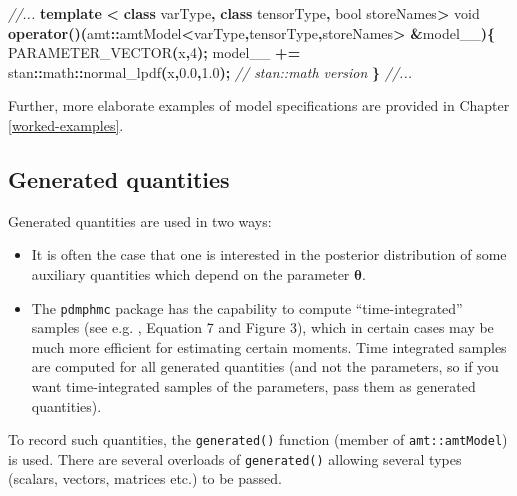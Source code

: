 \documentclass[
]{book}
\newenvironment{Shaded}{\begin{snugshade}}{\end{snugshade}}
\newcommand{\CommentTok}[1]{\textcolor[rgb]{0.56,0.35,0.01}{\textit{#1}}}
\newcommand{\DataTypeTok}[1]{\textcolor[rgb]{0.13,0.29,0.53}{#1}}
\newcommand{\DecValTok}[1]{\textcolor[rgb]{0.00,0.00,0.81}{#1}}
\newcommand{\FloatTok}[1]{\textcolor[rgb]{0.00,0.00,0.81}{#1}}
\newcommand{\KeywordTok}[1]{\textcolor[rgb]{0.13,0.29,0.53}{\textbf{#1}}}
\newcommand{\NormalTok}[1]{#1}
\newcommand{\OperatorTok}[1]{\textcolor[rgb]{0.81,0.36,0.00}{\textbf{#1}}}
\begin{document}
\begin{Shaded}
\begin{Highlighting}[]
\CommentTok{//...}
  \KeywordTok{template} \OperatorTok{\textless{}} \KeywordTok{class}\NormalTok{ varType}\OperatorTok{,} \KeywordTok{class}\NormalTok{ tensorType}\OperatorTok{,} \DataTypeTok{bool}\NormalTok{ storeNames}\OperatorTok{\textgreater{}}
  \DataTypeTok{void} \KeywordTok{operator}\OperatorTok{()(}\NormalTok{amt}\OperatorTok{::}\NormalTok{amtModel}\OperatorTok{\textless{}}\NormalTok{varType}\OperatorTok{,}\NormalTok{tensorType}\OperatorTok{,}\NormalTok{storeNames}\OperatorTok{\textgreater{}} \OperatorTok{\&}\NormalTok{model\_\_}\OperatorTok{)\{}
\NormalTok{    PARAMETER\_VECTOR}\OperatorTok{(}\NormalTok{x}\OperatorTok{,}\DecValTok{4}\OperatorTok{);}
\NormalTok{    model\_\_ }\OperatorTok{+=}\NormalTok{ stan}\OperatorTok{::}\NormalTok{math}\OperatorTok{::}\NormalTok{normal\_lpdf}\OperatorTok{(}\NormalTok{x}\OperatorTok{,}\FloatTok{0.0}\OperatorTok{,}\FloatTok{1.0}\OperatorTok{);} \CommentTok{// stan::math version}
  \OperatorTok{\}}
\CommentTok{//...}
\end{Highlighting}
\end{Shaded}

Further, more elaborate examples of model specifications are provided in Chapter \ref{worked-examples}.

\hypertarget{generated-quantities}{%
\subsection{Generated quantities}\label{generated-quantities}}

Generated quantities are used in two ways:

\begin{itemize}
\item
  It is often the case that one is interested in the posterior distribution of some auxiliary quantities which depend on the parameter \(\boldsymbol \theta\).
\item
  The \texttt{pdmphmc} package has the capability to compute ``time-integrated'' samples (see e.g. \citet{kleppe_CTHMC}, Equation 7 and Figure 3), which in certain cases may be much more efficient for estimating certain moments. Time integrated samples are computed for all generated quantities (and not the parameters, so if you want time-integrated samples of the parameters, pass them as generated quantities).
\end{itemize}

To record such quantities, the \texttt{generated()} function (member of \texttt{amt::amtModel}) is used. There are several overloads of \texttt{generated()} allowing several types (scalars, vectors, matrices etc.) to be passed.
\end{document}
